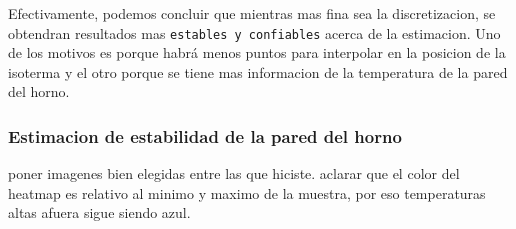 \vspace{0.5cm}

Efectivamente, podemos concluir que mientras mas fina sea la discretizacion, se obtendran resultados mas \texttt{estables y confiables} acerca de la estimacion. Uno de los motivos es porque habrá menos puntos para interpolar en la posicion de la isoterma y el otro porque se tiene mas informacion de la temperatura de la pared del horno.

\subsubsection{Estimacion de estabilidad de la pared del horno}
poner imagenes bien elegidas entre las que hiciste. aclarar que el color del heatmap es relativo al minimo y maximo de la muestra, por eso temperaturas altas afuera sigue siendo azul.